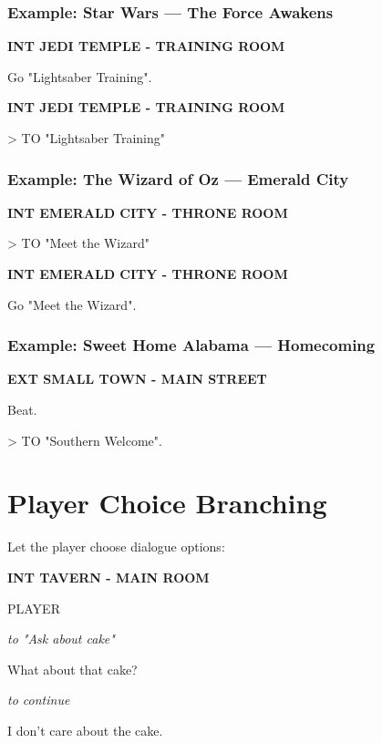 \documentclass[11pt,letterpaper,oldstylefigures]{memoir}
\newcommand{\slugline}[1]{\nobreak\textbf{\MakeUppercase{#1}}\par\nobreak\vspace{1\baselineskip}}
\newcommand{\speaker}[1]{\nobreak\hspace*{0.333\textwidth}\MakeUppercase{#1}\par\nobreak\vspace{0.5\baselineskip}}
\newcommand{\dialogue}[1]{\nobreak\hspace*{0.25\textwidth}\begin{minipage}{0.5\textwidth}#1\end{minipage}\par\vspace{1\baselineskip}}
\newcommand{\parenthetical}[1]{\nobreak\vspace{0.5\baselineskip}\hspace*{0.292\textwidth}\begin{minipage}{0.416\textwidth}\textit{#1}\end{minipage}\par\vspace{0.5\baselineskip}}
\newcommand{\stagedir}[1]{#1\par\vspace{1\baselineskip}}
\newenvironment{FountainExample}
  {\begingroup
  \ttfamily\small
   \setlength{\parindent}{0pt}
  \setlength{\parskip}{0.5em}
  \allowdisplaybreaks
  \setlength{\displaywidowpenalty}{0}
  \setlength{\widowpenalty}{0}
  \setlength{\clubpenalty}{0}
  \setlength{\interlinepenalty}{0}
}
  {\endgroup}
\newcommand{\sceneendcmd}[1]{\begin{flushright}\ttfamily #1\end{flushright}}
\begin{document}
\subsubsection{Example: Star Wars — The Force Awakens}

\begin{FountainExample}
\slugline{INT JEDI TEMPLE - TRAINING ROOM}

\stagedir{Go "Lightsaber Training".}
\end{FountainExample}

\begin{FountainExample}
\slugline{INT JEDI TEMPLE - TRAINING ROOM}

\sceneendcmd{> TO "Lightsaber Training"}
\end{FountainExample}

\subsubsection{Example: The Wizard of Oz — Emerald City}

\begin{FountainExample}
\slugline{INT EMERALD CITY - THRONE ROOM}

\sceneendcmd{> TO "Meet the Wizard"}
\end{FountainExample}

\begin{FountainExample}
\slugline{INT EMERALD CITY - THRONE ROOM}

\stagedir{Go "Meet the Wizard".}
\end{FountainExample}

\subsubsection{Example: Sweet Home Alabama — Homecoming}

\begin{FountainExample}
\slugline{EXT SMALL TOWN - MAIN STREET}

\stagedir{Beat.}
\stagedir{> TO "Southern Welcome".}
\end{FountainExample}

\section{Player Choice Branching}

Let the player choose dialogue options:

\begin{FountainExample}
\slugline{INT TAVERN - MAIN ROOM}

\speaker{PLAYER}
\parenthetical{to "Ask about cake"}
\dialogue{What about that cake?}
\parenthetical{to continue}
\dialogue{I don't care about the cake.}
\end{FountainExample}
\end{document}
